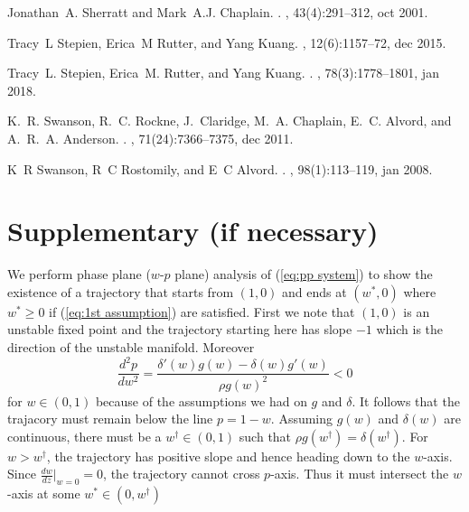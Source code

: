 \documentclass{aims}
\numberwithin{equation}{section}
\begin{document}
\begin{thebibliography}{10}
Jonathan~A. Sherratt and Mark~A.J. Chaplain.
.
, 43(4):291--312, oct 2001.

Tracy~L Stepien, Erica~M Rutter, and Yang Kuang.
, 12(6):1157--72,
  dec 2015.

Tracy~L. Stepien, Erica~M. Rutter, and Yang Kuang.
.
, 78(3):1778--1801, jan
  2018.

K.~R. Swanson, R.~C. Rockne, J.~Claridge, M.~A. Chaplain, E.~C. Alvord, and
  A.~R.~A. Anderson.
.
, 71(24):7366--7375, dec 2011.

K~R Swanson, R~C Rostomily, and E~C Alvord.
.
, 98(1):113--119, jan 2008.

\end{thebibliography}

\section*{Supplementary (if necessary)}

We perform phase plane ($w$-$p$ plane) analysis of (\ref{eq:pp system})
to show the existence of a trajectory that starts from $(1,0)$ and
ends at $(w^{*},0)$ where $w^{*}\ge0$ if (\ref{eq:1st assumption})
are satisfied. First we note that $(1,0)$ is an unstable fixed point
and the trajectory starting here has slope $-1$ which is the direction
of the unstable manifold. Moreover 
\[
\frac{d^{2}p}{dw^{2}}=\frac{\delta'(w)g(w)-\delta(w)g'(w)}{\rho g(w)^{2}}<0
\]
for $w\in(0,1)$ because of the assumptions we had on $g$ and $\delta$.
It follows that the trajacory must remain below the line $p=1-w$.
Assuming $g(w)$ and $\delta(w)$ are continuous, there must be a
$w^{\dagger}\in(0,1)$ such that $\rho g(w^{\dagger})=\delta(w^{\dagger})$.
For $w>w^{\dagger}$, the trajectory has positive slope and hence
heading down to the $w$-axis. Since $\frac{dw}{dz}\vert_{w=0}=0$,
the trajectory cannot cross $p$-axis. Thus it must intersect the
$w$-axis at some $w^{*}\in(0,w^{\dagger})$ 
\end{document}
